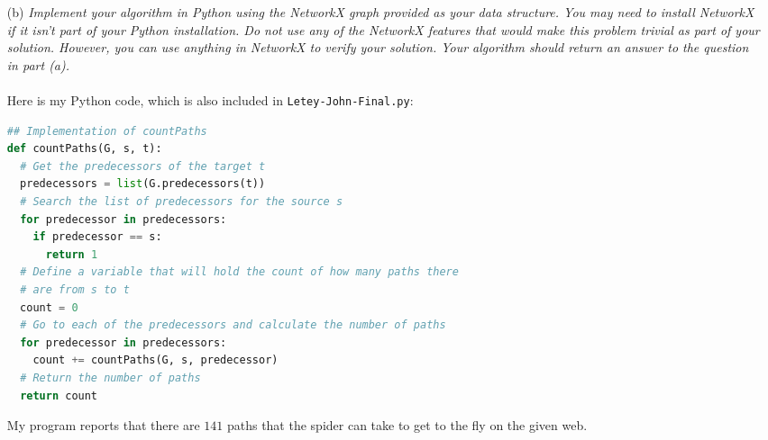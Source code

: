 \documentclass[12pt]{article}
\begin{document}
{\begin{enumerate}
\item[(b)]\textsl{Implement your algorithm in Python using the NetworkX graph provided as your data structure. You may need to install NetworkX if it isn’t part of your Python installation. Do not use any of the NetworkX features that would make this problem trivial as part of your solution. However, you can use anything in NetworkX to verify your solution. Your algorithm should return an answer to the question in part (a).}\\ \\
Here is my Python code, which is also included in \texttt{Letey-John-Final.py}:
\begin{lstlisting}[language=Python]
## Implementation of countPaths
def countPaths(G, s, t):
  # Get the predecessors of the target t
  predecessors = list(G.predecessors(t))
  # Search the list of predecessors for the source s
  for predecessor in predecessors:
    if predecessor == s:
      return 1
  # Define a variable that will hold the count of how many paths there
  # are from s to t
  count = 0
  # Go to each of the predecessors and calculate the number of paths
  for predecessor in predecessors:
    count += countPaths(G, s, predecessor)
  # Return the number of paths
  return count
\end{lstlisting}
My program reports that there are $\boxed{141}$ paths that the spider can take to get to the fly on the given web.
\end{enumerate}

\newpage
}
\end{document}
